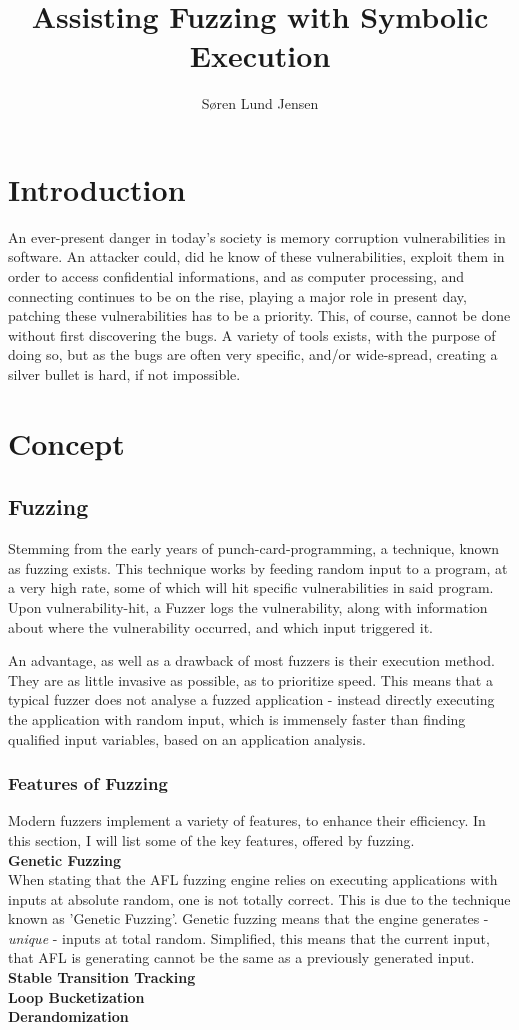 \documentclass[a4paper]{article}
\title{Assisting Fuzzing with Symbolic Execution}
\author{Søren Lund Jensen}
\newcommand{\tbf}[1]{\textbf{#1}}
\newcommand{\tit}[1]{\textit{#1}}
\begin{document}
\maketitle

\tableofcontents

\newpage

\section{Introduction}
An ever-present danger in today's society is memory corruption vulnerabilities in software. An attacker could, did he know of these vulnerabilities, exploit them in order to access confidential informations, and as computer processing, and connecting continues to be on the rise, playing a major role in present day, patching these vulnerabilities has to be a priority. This, of course, cannot be done without first discovering the bugs. A variety of tools exists, with the purpose of doing so, but as the bugs are often very specific, and/or wide-spread, creating a silver bullet is hard, if not impossible.

\section{Concept}

\subsection{Fuzzing}
Stemming from the early years of punch-card-programming, a technique, known as fuzzing exists. This technique works by feeding random input to a program, at a very high rate, some of which will hit specific vulnerabilities in said program. Upon vulnerability-hit, a Fuzzer logs the vulnerability, along with information about where the vulnerability occurred, and which input triggered it.

An advantage, as well as a drawback of most fuzzers is their execution method. They are as little invasive as possible, as to prioritize speed. This means that a typical fuzzer does not analyse a fuzzed application - instead directly executing the application with random input, which is immensely faster than finding qualified input variables, based on an application analysis.
\subsubsection*{Features of Fuzzing}
Modern fuzzers implement a variety of features, to enhance their efficiency. In this section, I will list some of the key features, offered by fuzzing.\\
\tbf{Genetic Fuzzing}\\
When stating that the AFL fuzzing engine relies on executing applications with inputs at absolute random, one is not totally correct. This is due to the technique known as 'Genetic Fuzzing'. Genetic fuzzing means that the engine generates - \tit{unique} - inputs at total random. Simplified, this means that the current input, that AFL is generating cannot be the same as a previously generated input.  
\tbf{Stable Transition Tracking}\\
\tbf{Loop Bucketization}\\
\tbf{Derandomization}
\end{document}
